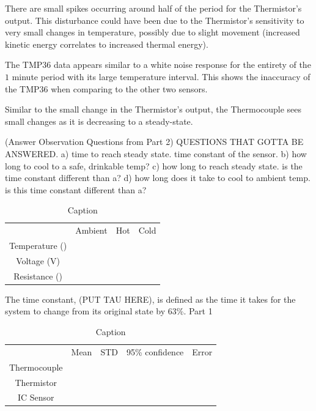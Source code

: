 \documentclass{article}
\begin{document}
    There are small spikes occurring around half of the period for the Thermistor's output. This disturbance could have been due to the Thermistor's sensitivity to very small changes in temperature, possibly due to slight movement (increased kinetic energy correlates to increased thermal energy).
    
    The TMP36 data appears similar to a white noise response for the entirety of the $1$ minute period with its large temperature interval. This shows the inaccuracy of the TMP36 when comparing to the other two sensors.
    
    Similar to the small change in the Thermistor's output, the Thermocouple sees small changes as it is decreasing to a steady-state. 

(Answer Observation Questions from Part 2)
QUESTIONS THAT GOTTA BE ANSWERED.
    a) time to reach steady state.  time constant of the sensor.  
    b) how long to cool to a safe, drinkable temp?
    c) how long to reach steady state.  is the time constant different than a?
    d) how long does it take to cool to ambient temp.  is this time constant different than a? 


\begin{table}
    \centering
    \begin{tabular}{cccc}
         &  Ambient&  Hot& Cold\\
         Temperature ()&  &  & \\
         Voltage (V)&  &  & \\
 Resistance ()& & &\\
    \end{tabular}
    \caption{Caption}
    \label{tab:my_label}
\end{table}

The time constant, (PUT TAU HERE),  is defined as the time it takes for the system to change from its original state by 63\%.  %
Part 1 %
\begin{table}
    \centering
    \begin{tabular}{ccccc}
         &  Mean&  STD&  95\% confidence& Error\\
         Thermocouple&  &  &  & \\
         Thermistor&  &  &  & \\
         IC Sensor&  &  &  & \\
    \end{tabular}
    \caption{Caption}
    \label{tab:my_label}
\end{table}
    
\end{document}
